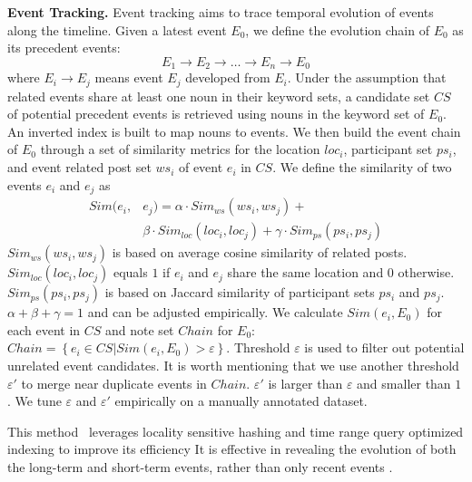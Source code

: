 \noindent\textbf{Event Tracking.}
\label{tracing}
Event tracking aims to trace temporal evolution of events along the timeline.
Given a latest event $E_{0}$, we define the evolution chain of $E_{0}$ as its precedent events:
\begin{equation}
E_{1}\rightarrow E_{2}\rightarrow\ldots\rightarrow E_{n}\rightarrow E_{0}
\end{equation}
where $E_{i}\rightarrow E_{j}$ means event $E_{j}$ developed from $E_{i}$.
Under the assumption that related events share at least one noun in their keyword sets,
a candidate set $CS$ of potential precedent events is retrieved using nouns in the keyword set of $E_{0}$.
An inverted index is built to map nouns to events.
We then build the event chain of $E_{0}$ through a set of similarity metrics for
the location $loc_{i}$, participant set $ps_{i}$, and event related post set $ws_{i}$
of event $e_{i}$ in $CS$.
We define the similarity of two events $e_{i}$ and $e_{j}$ as
\begin{equation}
\begin{aligned}
Sim(e_{i}, &e_{j})=\alpha\cdot Sim_{ws}(ws_{i},ws_{j}) + \\& \beta\cdot Sim_{loc}(loc_{i},loc_{j})
+ \gamma\cdot Sim_{ps}(ps_{i},ps_{j})
\end{aligned}
\end{equation}
$Sim_{ws}(ws_{i},ws_{j})$ is based on average cosine similarity of related posts.
$Sim_{loc}(loc_{i},loc_{j})$ equals $1$ if $e_{i}$ and $e_{j}$ share the same location and 0 otherwise.
$Sim_{ps}(ps_{i},ps_{j})$ is based on Jaccard similarity of participant sets $ps_{i}$ and $ps_{j}$.
$\alpha+\beta+\gamma=1$ and can be adjusted empirically.
We calculate $Sim(e_{i}, E_{0})$ for each event in $CS$ and note set $Chain$ for $E_{0}$:
$Chain=\left\{ e_{i} \in CS | Sim(e_{i}, E_{0}) > \varepsilon \right\}$.
Threshold $\varepsilon$ is used to filter out potential unrelated event candidates.
It is worth mentioning that we use another threshold $\varepsilon '$ to merge near duplicate events in $Chain$.
$\varepsilon '$ is larger than $\varepsilon$ and smaller than $1$.
We tune $\varepsilon$ and $\varepsilon '$ empirically on a manually annotated dataset.

This method~\cite{lu2015discovering} leverages locality sensitive hashing and time range query optimized indexing to improve its efficiency
It is effective in revealing the evolution of both the long-term and short-term events,
rather than only recent events \cite{lee2014cast, saha2012learning}.

